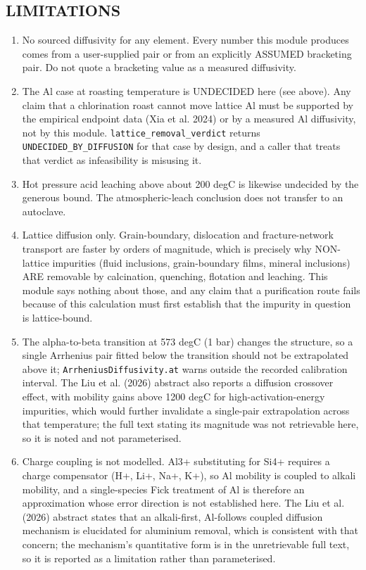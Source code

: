 \documentclass[10pt,a4paper,twoside]{report}
\begin{document}
\subsection*{LIMITATIONS}

\begin{enumerate}[leftmargin=*,label=\arabic*.]
\item No sourced diffusivity for any element. Every number this module produces comes from a user-supplied pair or from an explicitly ASSUMED bracketing pair. Do not quote a bracketing value as a measured diffusivity.
\item The Al case at roasting temperature is UNDECIDED here (see above). Any claim that a chlorination roast cannot move lattice Al must be supported by the empirical endpoint data (Xia et al. 2024) or by a measured Al diffusivity, not by this module. \texttt{lattice\_removal\_verdict} returns \texttt{UNDECIDED\_BY\_DIFFUSION} for that case by design, and a caller that treats that verdict as infeasibility is misusing it.
\item Hot pressure acid leaching above about 200 degC is likewise undecided by the generous bound. The atmospheric-leach conclusion does not transfer to an autoclave.
\item Lattice diffusion only. Grain-boundary, dislocation and fracture-network transport are faster by orders of magnitude, which is precisely why NON-lattice impurities (fluid inclusions, grain-boundary films, mineral inclusions) ARE removable by calcination, quenching, flotation and leaching. This module says nothing about those, and any claim that a purification route fails because of this calculation must first establish that the impurity in question is lattice-bound.
\item The alpha-to-beta transition at 573 degC (1 bar) changes the structure, so a single Arrhenius pair fitted below the transition should not be extrapolated above it; \texttt{ArrheniusDiffusivity.at} warns outside the recorded calibration interval. The Liu et al. (2026) abstract also reports a diffusion crossover effect, with mobility gains above 1200 degC for high-activation-energy impurities, which would further invalidate a single-pair extrapolation across that temperature; the full text stating its magnitude was not retrievable here, so it is noted and not parameterised.
\item Charge coupling is not modelled. Al3+ substituting for Si4+ requires a charge compensator (H+, Li+, Na+, K+), so Al mobility is coupled to alkali mobility, and a single-species Fick treatment of Al is therefore an approximation whose error direction is not established here. The Liu et al. (2026) abstract states that an alkali-first, Al-follows coupled diffusion mechanism is elucidated for aluminium removal, which is consistent with that concern; the mechanism's quantitative form is in the unretrievable full text, so it is reported as a limitation rather than parameterised.

\end{enumerate}
\end{document}
